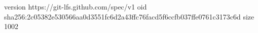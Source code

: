 version https://git-lfs.github.com/spec/v1
oid sha256:2c05382e530566aa0d3551fc6d2a43ffc76facd5f6ccfb037ffe0761c3173c6d
size 1002
